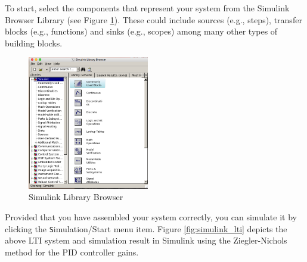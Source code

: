 \documentclass[paper=letter, fontsize=11pt]{scrartcl}
\numberwithin{equation}{section}
\numberwithin{figure}{section}
\numberwithin{table}{section}
\begin{document}
\par
To start, select the components that represent your system from the Simulink
Browser Library (see Figure \ref{fig:simulink_browser}). These could
include sources (e.g., steps), transfer blocks (e.g., functions) and sinks
(e.g., scopes) among many other types of building blocks.

\begin{figure}[h]
	\centering
	\includegraphics[width=200px]{graphics/simulink-browser}
	\caption{Simulink Library Browser}
	\label{fig:simulink_browser}
\end{figure}

\par
Provided that you have assembled your system correctly, you can simulate it
by clicking the {\texttt Simulation/\-Start} menu item. Figure
\ref{fig:simulink_lti} depicts the above \ac{LTI} system and simulation
result in Simulink using the Ziegler-Nichols method for the \ac{PID} controller
gains.

\end{document}
